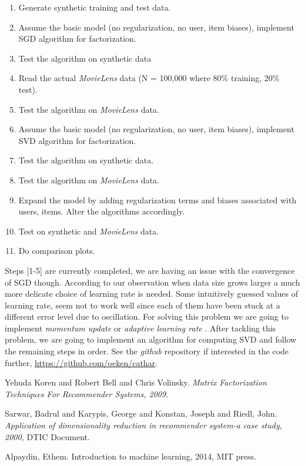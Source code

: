 \documentclass[dvips,11pt]{article}
\begin{document}
\begin{enumerate}
	\itemsep 0em
	\item Generate synthetic training and test data.
	\item Assume the basic model (no regularization, no user, item biases), implement SGD algorithm for factorization.
	\item Test the algorithm on synthetic data
	\item Read the actual \textit{MovieLens} data (N = 100,000 where 80\% training, 20\% test).
	\item Test the algorithm on \textit{MovieLens} data.
	\item Assume the basic model (no regularization, no user, item biases), implement SVD algorithm \cite{sarwar} for factorization.
	\item Test the algorithm on synthetic data.
	\item Test the algorithm on \textit{MovieLens }data.
	\item Expand the model by adding regularization terms and biases associated with users, items. Alter the algorithms accordingly.
	\item Test on synthetic and \textit{MovieLens }data.
	\item Do comparison plots.	
\end{enumerate}
Steps [1-5] are currently completed, we are having an issue with the convergence of SGD though. According to our observation when data size grows larger a much more delicate choice of learning rate is needed. Some intuitively guessed values of learning rate, seem not to work well since each of them have been stuck at a different error level due to oscillation. For solving this problem we are going to implement \textit{momentum update} or \textit{adaptive learning rate} \cite{alpaydin}. After tackling this problem, we are going to implement an algorithm for computing SVD \cite{sarwar} and follow the remaining steps in order. See the \textit{github} repository if interested in the code further, \url{https://github.com/oeken/cathar}.

\begin{thebibliography}{9}
	Yehuda Koren and Robert Bell and Chris Volinsky.
	\textit{Matrix Factorization Techniques For Recommender Systems, 2009.}

	Sarwar, Badrul and Karypis, George and Konstan, Joseph and Riedl, John.
	\textit{Application of dimensionality reduction in recommender system-a case study, 
	2000,}
	DTIC Document.
	
	Alpaydin, Ethem.
	Introduction to machine learning,
	2014,
	MIT press.
\end{thebibliography}

%
%
\end{document}
